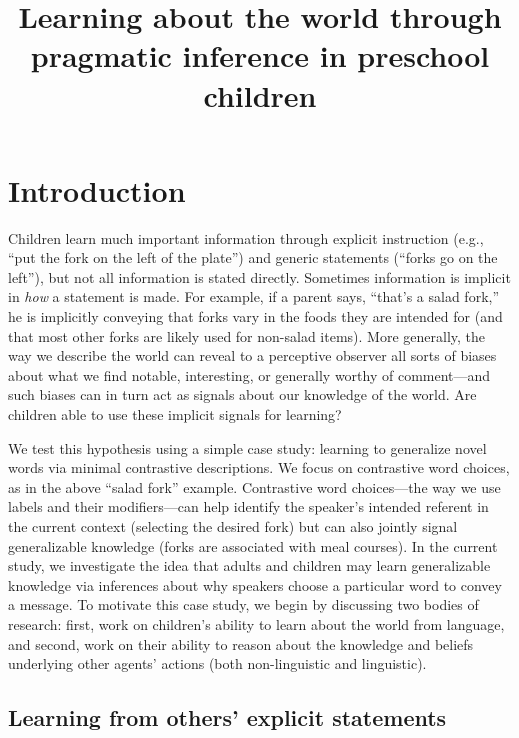 \documentclass[man]{apa2}
\title{
Learning about the world through pragmatic inference in preschool children}
\begin{document}
\maketitle                            


\section{Introduction}

Children learn much important information through explicit instruction (e.g., ``put the fork on the left of the plate'') and generic statements (``forks go on the left''), but not all information is stated directly. Sometimes information is implicit in \emph{how} a statement is made. For example, if a parent says, ``that's a salad fork,'' he is implicitly conveying that forks vary in the foods they are intended for (and that most other forks are likely used for non-salad items). More generally, the way we describe the world can reveal to a perceptive observer all sorts of biases about what we find notable, interesting, or generally worthy of comment---and such biases can in turn act as signals about our knowledge of the world. Are children able to use these implicit signals for learning? 

We test this hypothesis using a simple case study: learning to generalize novel words via minimal contrastive descriptions.  We focus on contrastive word choices, as in the above ``salad fork'' example. Contrastive word choices---the way we use labels and their modifiers---can help identify the speaker's intended referent in the current context (selecting the desired fork) but can also jointly signal generalizable knowledge (forks are associated with meal courses). In the current study, we investigate the idea that adults and children may learn generalizable knowledge via inferences about why speakers choose a particular word to convey a message. To motivate this case study, we begin by discussing two bodies of research: first, work on children's ability to learn about the world from language, and second, work on their ability to reason about the knowledge and beliefs underlying other agents' actions (both non-linguistic and linguistic). 


\subsection{Learning from others' explicit statements}
\end{document}
